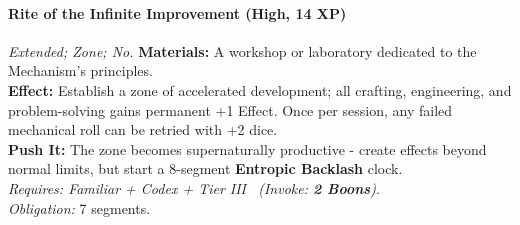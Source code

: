 \paragraph{Rite of the Infinite Improvement (High, 14 XP)} \emph{Extended; Zone; No.}
\textbf{Materials:} A workshop or laboratory dedicated to the Mechanism's principles. \\
\textbf{Effect:} Establish a zone of accelerated development; all crafting, engineering, and problem-solving gains permanent +1 Effect. Once per session, any failed mechanical roll can be retried with +2 dice. \\
\textbf{Push It:} The zone becomes supernaturally productive - create effects beyond normal limits, but start a 8-segment \textbf{Entropic Backlash} clock. \\
\emph{Requires: Familiar + Codex + Tier III \ (\textit{Invoke:} \textbf{2 Boons}).} \\
\emph{Obligation:} 7 segments.
